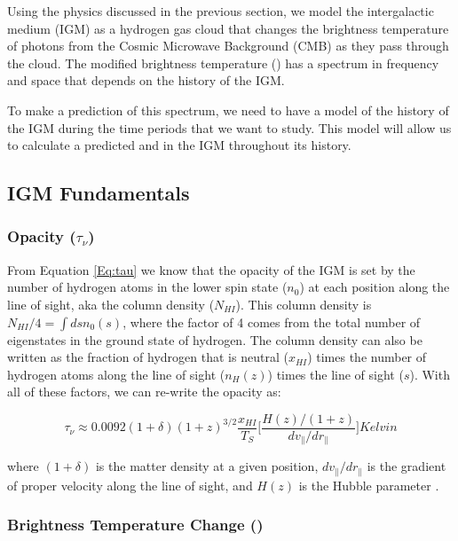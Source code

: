 Using the physics discussed in the previous section, we model the intergalactic medium (IGM) as a hydrogen gas cloud that changes the brightness temperature of photons from the Cosmic Microwave Background (CMB) as they pass through the cloud. The modified brightness temperature (\dtb) has a spectrum in frequency and space that depends on the history of the IGM. 

To make a prediction of this spectrum, we need to have a model of the history of the IGM during the time periods that we want to study. This model will allow us to calculate a predicted \ts and \tu in the IGM throughout its history. 


\subsection{IGM Fundamentals}

\subsubsection{Opacity ($\tau_\nu$)}

From Equation \ref{Eq:tau} we know that the opacity of the IGM is set by the number of hydrogen atoms in the lower spin state ($n_0$) at each position along the line of sight, aka the column density ($N_{HI}$). This column density is $N_{HI}/4 = \int ds n_0 (s)$, where the factor of 4 comes from the total number of eigenstates in the ground state of hydrogen. The column density can also be written as the fraction of hydrogen that is neutral ($x_{HI}$) times the number of hydrogen atoms along the line of sight ($n_H (z)$) times the line of sight ($s$).  
With all of these factors, we can re-write the opacity as:

\begin{equation}
\tau_{\nu} \approx 0.0092 (1+\delta) (1+z)^{3/2} \frac{x_{HI}}{T_S} \Big[ \frac{H(z)/(1+z)}{dv_{\parallel}/dr_{\parallel}} \Big] Kelvin
\end{equation} 

where $(1+\delta)$ is the matter density at a given position, $dv_{\parallel}/dr_{\parallel}$ is the gradient of proper velocity along the line of sight, and $H(z)$ is the Hubble parameter \cite{furlanetto_2006}. 

\subsubsection{Brightness Temperature Change (\dtb)}

